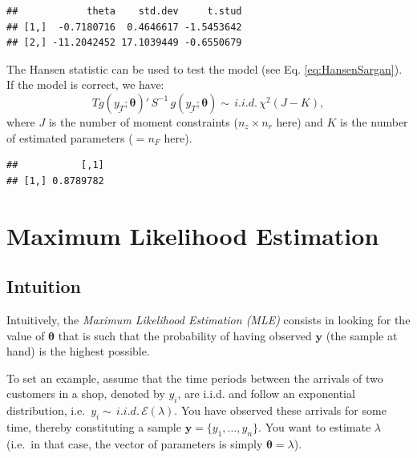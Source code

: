 \documentclass[
  12pt,
]{book}
\newenvironment{Shaded}{\begin{snugshade}}{\end{snugshade}}
\newcommand{\AttributeTok}[1]{\textcolor[rgb]{0.77,0.63,0.00}{#1}}
\newcommand{\FunctionTok}[1]{\textcolor[rgb]{0.00,0.00,0.00}{#1}}
\newcommand{\NormalTok}[1]{#1}
\newcommand{\OtherTok}[1]{\textcolor[rgb]{0.56,0.35,0.01}{#1}}
\newcommand{\SpecialCharTok}[1]{\textcolor[rgb]{0.00,0.00,0.00}{#1}}
\theoremstyle{definition}
\theoremstyle{definition}
\theoremstyle{definition}
\theoremstyle{definition}
\theoremstyle{remark}
\begin{document}
\begin{verbatim}
##            theta    std.dev     t.stud
## [1,]  -0.7180716  0.4646617 -1.5453642
## [2,] -11.2042452 17.1039449 -0.6550679
\end{verbatim}

The Hansen statistic can be used to test the model (see Eq. \eqref{eq:HansenSargan}). If the model is correct, we have:
\[
T g(\underline{y_T};{\boldsymbol\theta})'\, S^{-1} \, g(\underline{y_T};{\boldsymbol\theta}) \sim \,i.i.d.\,\chi^2(J - K),
\]
where \(J\) is the number of moment constraints (\(n_z \times n_r\) here) and \(K\) is the number of estimated parameters (\(=n_F\) here).

\begin{Shaded}
\end{Shaded}

\begin{verbatim}
##           [,1]
## [1,] 0.8789782
\end{verbatim}

\hypertarget{secMLE}{%
\section{Maximum Likelihood Estimation}\label{secMLE}}

\hypertarget{intuition}{%
\subsection{Intuition}\label{intuition}}

Intuitively, the \emph{Maximum Likelihood Estimation (MLE)} consists in looking for the value of \({\boldsymbol\theta}\) that is such that the probability of having observed \(\mathbf{y}\) (the sample at hand) is the highest possible.

To set an example, assume that the time periods between the arrivals of two customers in a shop, denoted by \(y_i\), are i.i.d. and follow an exponential distribution, i.e.~\(y_i \sim \,i.i.d.\, \mathcal{E}(\lambda)\). You have observed these arrivals for some time, thereby constituting a sample \(\mathbf{y}=\{y_1,\dots,y_n\}\). You want to estimate \(\lambda\) (i.e.~in that case, the vector of parameters is simply \({\boldsymbol\theta} = \lambda\)).
\end{document}
